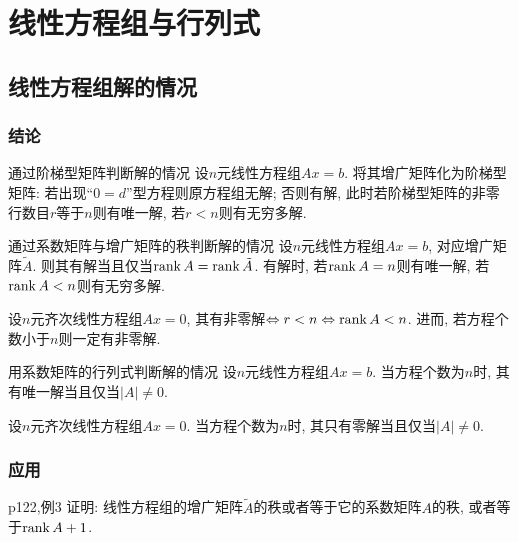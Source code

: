 \chapter{线性方程组与行列式}

\section{线性方程组解的情况}

\subsection*{结论}

\begin{theorem}{通过阶梯型矩阵判断解的情况}
	设$n$元线性方程组$Ax=b$. 将其增广矩阵化为阶梯型矩阵: 若出现“$0=d$”型方程则原方程组无解; 否则有解, 此时若阶梯型矩阵的非零行数目$r$等于$n$则有唯一解, 若$r<n$则有无穷多解. 
\end{theorem}

\begin{theorem}{通过系数矩阵与增广矩阵的秩判断解的情况}
	设$n$元线性方程组$Ax=b$, 对应增广矩阵$\tilde{A}$. 则其有解当且仅当$\operatorname{rank} A = \operatorname{rank} \tilde{A}$. 有解时, 若$\operatorname{rank} A = n$则有唯一解, 若$\operatorname{rank} A < n$则有无穷多解. 
\end{theorem}

\begin{corollary}{}
	设$n$元齐次线性方程组$Ax=0$, 其有非零解$\Leftrightarrow r<n \Leftrightarrow \operatorname{rank} A <n$. 进而, 若方程个数小于$n$则一定有非零解. 
\end{corollary}

\begin{theorem}{用系数矩阵的行列式判断解的情况}
	设$n$元线性方程组$Ax=b$. 当方程个数为$n$时, 其有唯一解当且仅当$|A| \neq 0$. 
\end{theorem}

\begin{corollary}{}
	设$n$元齐次线性方程组$Ax=0$. 当方程个数为$n$时, 其只有零解当且仅当$|A| \neq 0$. 
\end{corollary}

\subsection*{应用}

\begin{example}{p122,例3}
	证明: 线性方程组的增广矩阵$\tilde{A}$的秩或者等于它的系数矩阵$A$的秩, 或者等于$\operatorname{rank} A +1$. 
\end{example}


